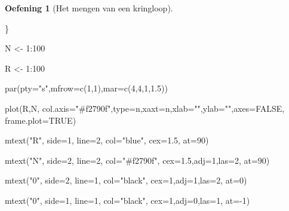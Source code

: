 \documentclass[
  a4paper,
]{scrbook}
\newenvironment{Shaded}{\begin{snugshade}}{\end{snugshade}}
\newcommand{\AttributeTok}[1]{\textcolor[rgb]{0.40,0.45,0.13}{#1}}
\newcommand{\ConstantTok}[1]{\textcolor[rgb]{0.56,0.35,0.01}{#1}}
\newcommand{\DecValTok}[1]{\textcolor[rgb]{0.68,0.00,0.00}{#1}}
\newcommand{\FloatTok}[1]{\textcolor[rgb]{0.68,0.00,0.00}{#1}}
\newcommand{\FunctionTok}[1]{\textcolor[rgb]{0.28,0.35,0.67}{#1}}
\newcommand{\NormalTok}[1]{\textcolor[rgb]{0.00,0.23,0.31}{#1}}
\newcommand{\OtherTok}[1]{\textcolor[rgb]{0.00,0.23,0.31}{#1}}
\newcommand{\SpecialCharTok}[1]{\textcolor[rgb]{0.37,0.37,0.37}{#1}}
\newcommand{\StringTok}[1]{\textcolor[rgb]{0.13,0.47,0.30}{#1}}
\theoremstyle{definition}
\newtheorem{exercise}{Oefening}[chapter]
\theoremstyle{remark}
\begin{document}
\begin{exercise}[Het mengen van een
kringloop]
\begin{Shaded}
\begin{Highlighting}[]
\NormalTok{\}}

\NormalTok{N }\OtherTok{\textless{}{-}} \DecValTok{1}\SpecialCharTok{:}\DecValTok{100}

\NormalTok{R }\OtherTok{\textless{}{-}} \DecValTok{1}\SpecialCharTok{:}\DecValTok{100}

\FunctionTok{par}\NormalTok{(}\AttributeTok{pty=}\StringTok{"s"}\NormalTok{,}\AttributeTok{mfrow=}\FunctionTok{c}\NormalTok{(}\DecValTok{1}\NormalTok{,}\DecValTok{1}\NormalTok{),}\AttributeTok{mar=}\FunctionTok{c}\NormalTok{(}\DecValTok{4}\NormalTok{,}\DecValTok{4}\NormalTok{,}\DecValTok{1}\NormalTok{,}\FloatTok{1.5}\NormalTok{))}

\FunctionTok{plot}\NormalTok{(R,N,  }\AttributeTok{col.axis=}\StringTok{"\#f2790f"}\NormalTok{,}\AttributeTok{type=}\StringTok{\textquotesingle{}n\textquotesingle{}}\NormalTok{,}\AttributeTok{xaxt=}\StringTok{\textquotesingle{}n\textquotesingle{}}\NormalTok{,}\AttributeTok{xlab=}\StringTok{""}\NormalTok{,}\AttributeTok{ylab=}\StringTok{""}\NormalTok{,}\AttributeTok{axes=}\ConstantTok{FALSE}\NormalTok{, }\AttributeTok{frame.plot=}\ConstantTok{TRUE}\NormalTok{)}

\FunctionTok{mtext}\NormalTok{(}\StringTok{"R"}\NormalTok{, }\AttributeTok{side=}\DecValTok{1}\NormalTok{, }\AttributeTok{line=}\DecValTok{2}\NormalTok{, }\AttributeTok{col=}\StringTok{"blue"}\NormalTok{, }\AttributeTok{cex=}\FloatTok{1.5}\NormalTok{, }\AttributeTok{at=}\DecValTok{90}\NormalTok{)}

\FunctionTok{mtext}\NormalTok{(}\StringTok{"N"}\NormalTok{, }\AttributeTok{side=}\DecValTok{2}\NormalTok{, }\AttributeTok{line=}\DecValTok{2}\NormalTok{, }\AttributeTok{col=}\StringTok{"\#f2790f"}\NormalTok{, }\AttributeTok{cex=}\FloatTok{1.5}\NormalTok{,}\AttributeTok{adj=}\DecValTok{1}\NormalTok{,}\AttributeTok{las=}\DecValTok{2}\NormalTok{, }\AttributeTok{at=}\DecValTok{90}\NormalTok{)}

\FunctionTok{mtext}\NormalTok{(}\StringTok{"0"}\NormalTok{, }\AttributeTok{side=}\DecValTok{2}\NormalTok{, }\AttributeTok{line=}\DecValTok{1}\NormalTok{, }\AttributeTok{col=}\StringTok{"black"}\NormalTok{, }\AttributeTok{cex=}\DecValTok{1}\NormalTok{,}\AttributeTok{adj=}\DecValTok{1}\NormalTok{,}\AttributeTok{las=}\DecValTok{2}\NormalTok{, }\AttributeTok{at=}\DecValTok{0}\NormalTok{)}

\FunctionTok{mtext}\NormalTok{(}\StringTok{"0"}\NormalTok{, }\AttributeTok{side=}\DecValTok{1}\NormalTok{, }\AttributeTok{line=}\DecValTok{1}\NormalTok{, }\AttributeTok{col=}\StringTok{"black"}\NormalTok{, }\AttributeTok{cex=}\DecValTok{1}\NormalTok{,}\AttributeTok{adj=}\DecValTok{0}\NormalTok{,}\AttributeTok{las=}\DecValTok{1}\NormalTok{, }\AttributeTok{at=}\SpecialCharTok{{-}}\DecValTok{1}\NormalTok{)}


\end{Highlighting}
\end{Shaded}
\end{exercise}
\end{document}
